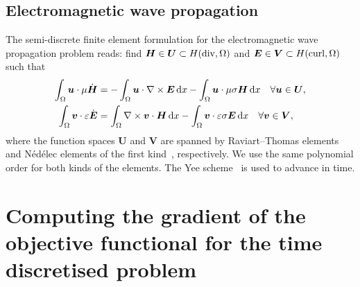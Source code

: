 \documentclass[a4paper]{article}
\renewcommand{\vec}{\boldsymbol}
\begin{document}
\subsection{Electromagnetic wave propagation}
\label{sec:em_discr}

The semi-discrete finite element formulation for the electromagnetic
wave propagation problem reads: find $\vec{H} \in \vec{U} \subset
H({\rm div}, \Omega)$ and $\vec{E} \in \vec{V} \subset H({\rm
  curl}, \Omega)$ such that
\begin{equation}
  \begin{aligned}
    \int_{\Omega} \vec{u} \cdot \mu \Dot{\vec{H}}
    &= -\int_{\Omega}\vec{u} \cdot \nabla \times \vec{E} \dif x
    - \int_{\Omega}\vec{u} \cdot \mu\sigma \vec{H} \dif x
    \quad \forall \vec{u} \in \vec{U},
    \\
    \int_{\Omega} \vec{v} \cdot \varepsilon \Dot{\vec{E}}
    &= \int_{\Omega} \nabla \times \vec{v} \cdot \vec{H} \dif x
    - \int_{\Omega} \vec{v} \cdot \varepsilon \sigma \vec{E} \dif x
    \quad \forall \vec{v} \in \vec{V},
  \end{aligned}
  \label{eq:emdiscr}
\end{equation}
where the function spaces $\vec{U}$ and $\vec{V}$ are spanned by
Raviart--Thomas elements~\citep{raviart77thomas} and N\'ed\'elec
elements of the first kind~\citep{nedelec80}, respectively. We use the
same polynomial order for both kinds of the elements.  The Yee
scheme~\citep{yee66} is used to advance in time.

\section{Computing the gradient of the objective functional for the
  time discretised problem}
\label{sec:gradient}
\end{document}
